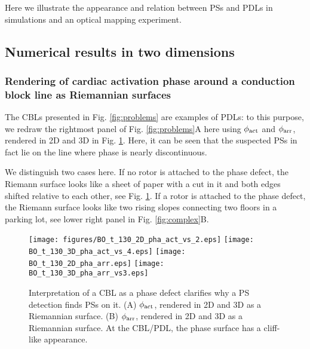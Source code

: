 \documentclass[aps,pre,amsfonts,amssymb,amsmath,twocolumn, superscriptaddress]{revtex4-1}
\newcommand{\phiact}{\ensuremath{\phi_{\rm act}}}
\newcommand{\phiarr}{\ensuremath{\phi_{\rm arr}}}
\begin{document}
Here we illustrate the appearance and relation between PSs and PDLs in  simulations and an optical mapping experiment. 

\subsection{Numerical results in two dimensions}

\subsubsection{Rendering of cardiac activation phase around a conduction block line as Riemannian surfaces}
The CBLs presented in Fig. \ref{fig:problems} are examples of PDLs: to this purpose, we redraw the rightmost panel of Fig. \ref{fig:problems}A here using $\phiact$ and $\phiarr$, rendered in 2D and 3D in Fig. \ref{fig:CBL_Riemann}. Here, it can be seen that the suspected PSs in fact lie on the line where phase is nearly discontinuous. 

We distinguish two cases here. If no rotor is attached to the phase defect, the Riemann surface looks like a sheet of paper with a cut in it and both edges shifted relative to each other, see Fig. \ref{fig:CBL_Riemann}. If a rotor is attached to the phase defect, the Riemann surface looks like two rising slopes connecting two floors in a parking lot, see lower right panel in Fig. \ref{fig:complex}B. 

\begin{figure*}
    \centering
{}    \texttt{[image: figures/BO\_t\_130\_2D\_pha\_act\_vs\_2.eps]}
    \texttt{[image: BO\_t\_130\_3D\_pha\_act\_vs\_4.eps]}
    \texttt{[image: BO\_t\_130\_2D\_pha\_arr.eps]}
    \texttt{[image: BO\_t\_130\_3D\_pha\_arr\_vs3.eps]} 
    \caption{Interpretation of a CBL as a phase defect clarifies why a PS detection finds PSs on it. (A) $\phiact$, rendered in 2D and 3D as a Riemannian surface. (B) $\phiarr$, rendered in 2D and 3D as a Riemannian surface. At the CBL/PDL, the phase surface has a cliff-like appearance. }
    \label{fig:CBL_Riemann}
\end{figure*}
\end{document}
